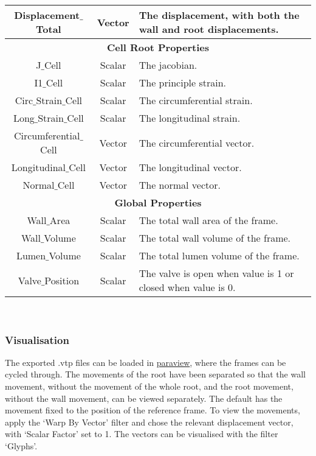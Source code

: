 \documentclass{article}
\begin{document}
\begin{tabular}{|c|c|l|}
	\hline
Displacement$\_$Total & Vector & The displacement, with both the wall and root displacements. \\
\hline
\hline
\multicolumn{3}{|c|}{\textbf{Cell Root Properties}} \\
\hline
J$\_$Cell	& Scalar& The jacobian.\\
\hline
I1$\_$Cell& Scalar & The principle strain. \\
\hline
Circ$\_$Strain$\_$Cell & Scalar & The circumferential strain.\\
\hline
Long$\_$Strain$\_$Cell & Scalar & The longitudinal strain. \\
	\hline
Circumferential$\_$Cell	&  Vector  & The circumferential vector.\\
	\hline
Longitudinal$\_$Cell 	&  Vector & The longitudinal vector.\\
	\hline
Normal$\_$Cell 	&  Vector & The normal vector.\\
\hline
\hline
\multicolumn{3}{|c|}{\textbf{Global  Properties}} \\
\hline
Wall$\_$Area	&Scalar &The total wall area of the frame. \\
	\hline
	Wall$\_$Volume	&Scalar &The total wall volume of the frame. \\
	\hline
	Lumen$\_$Volume	&Scalar &The total lumen volume of the frame. \\	
	\hline
Valve$\_$Position	&Scalar & The valve is open when value is 1 or closed when value is 0.\\
	\hline
\end{tabular}
\\
\subsubsection*{Visualisation}
The exported .vtp files can be loaded in \href{https://www.paraview.org}{paraview}, where the frames can be cycled through. The movements of the root have been separated so that the wall movement, without the movement of the whole root, and the root movement, without the wall movement, can be viewed separately. The default has the movement fixed to the position of the reference frame. To view the movements, apply the `Warp By Vector' filter and chose the relevant displacement vector, with `Scalar Factor' set to 1. The vectors can be visualised with the filter `Glyphs'.

\end{document}
